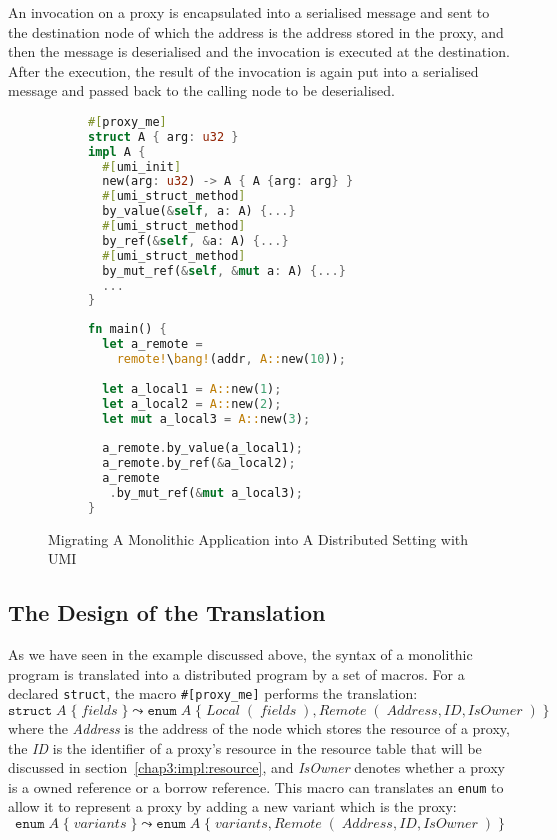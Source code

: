 An invocation on a proxy is encapsulated into a serialised message and sent to the destination node of which the address is the address stored in the proxy, and then the message is deserialised and the invocation is executed at the destination. After the execution, the result of the invocation is again put into a serialised message and passed back to the calling node to be deserialised.
\begin{figure}[t]
\centering
\begin{subfigure}[t]{0.53\textwidth}
    \centering
\begin{lstlisting}[language=Rust, style=boxed]
#[proxy_me]
struct A { arg: u32 }
impl A {
  #[umi_init]
  new(arg: u32) -> A { A {arg: arg} }
  #[umi_struct_method]
  by_value(&self, a: A) {...}
  #[umi_struct_method]
  by_ref(&self, &a: A) {...}
  #[umi_struct_method]
  by_mut_ref(&self, &mut a: A) {...}
  ...
}
\end{lstlisting}
\end{subfigure}
\hfill
\begin{subfigure}[t]{0.45\textwidth}
    \centering
\begin{lstlisting}[language=Rust, style=boxed]
fn main() {
  let a_remote = 
    remote!\bang!(addr, A::new(10));
  
  let a_local1 = A::new(1);
  let a_local2 = A::new(2);
  let mut a_local3 = A::new(3);
  
  a_remote.by_value(a_local1);
  a_remote.by_ref(&a_local2);
  a_remote
   .by_mut_ref(&mut a_local3);
}
\end{lstlisting}
\end{subfigure}
\vspace{1em}
\caption{Migrating A Monolithic Application into A Distributed Setting with UMI}
\label{chap3:impl:overview:fig}
\end{figure}

\subsection{The Design of the Translation}
\label{chap3:impl:proxy}
As we have seen in the example discussed above, the syntax of a monolithic program is translated into a distributed program by a set of macros. For a declared \texttt{struct}, the macro \texttt{\#[proxy\_me]} performs the translation:
\[
\texttt{struct}\; A\;\{\; \mathit{fields}\;\} \leadsto \texttt{enum}\; A\;\{\; \mathit{Local}\;(\;\mathit{fields}\;), \mathit{Remote}\;(\;\mathit{Address}, \mathit{ID}, \mathit{IsOwner}\;)\;\} 
\]
where the \textit{Address} is the address of the node which stores the resource of a proxy, the \textit{ID} is the identifier of a proxy's resource in the resource table that will be discussed in section~\ref{chap3:impl:resource}, and \textit{IsOwner} denotes whether a proxy is a owned reference or a borrow reference.
This macro can translates an \texttt{enum} to allow it to represent a proxy by adding a new variant which is the proxy:
\[
\texttt{enum}\; A\;\{\; \mathit{variants}\;\} \leadsto \texttt{enum}\; A\;\{\; \mathit{variants}, \mathit{Remote}\;(\;\mathit{Address}, \mathit{ID}, \mathit{IsOwner}\;)\;\} 
\]

